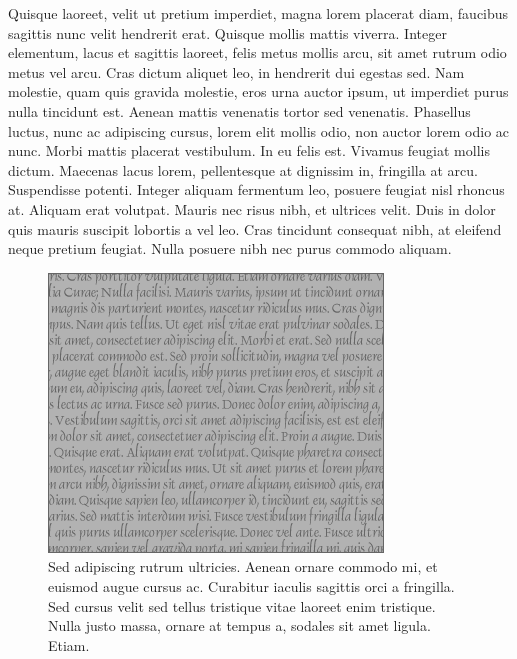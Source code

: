 Quisque laoreet, velit ut pretium imperdiet, magna lorem placerat diam, faucibus sagittis nunc velit hendrerit erat.
Quisque mollis mattis viverra.
Integer elementum, lacus et sagittis laoreet, felis metus mollis arcu, sit amet rutrum odio metus vel arcu.
Cras dictum aliquet leo, in hendrerit dui egestas sed.
Nam molestie, quam quis gravida molestie, eros urna auctor ipsum, ut imperdiet purus nulla tincidunt est.
Aenean mattis venenatis tortor sed venenatis.
Phasellus luctus, nunc ac adipiscing cursus, lorem elit mollis odio, non auctor lorem odio ac nunc.
Morbi mattis placerat vestibulum.
In eu felis est.
Vivamus feugiat mollis dictum.
Maecenas lacus lorem, pellentesque at dignissim in, fringilla at arcu.
Suspendisse potenti.
Integer aliquam fermentum leo, posuere feugiat nisl rhoncus at.
Aliquam erat volutpat.
Mauris nec risus nibh, et ultrices velit.
Duis in dolor quis mauris suscipit lobortis a vel leo.
Cras tincidunt consequat nibh, at eleifend neque pretium feugiat.
Nulla posuere nibh nec purus commodo aliquam.

\begin{figure}[t]
  \centering
  \includegraphics{figs/large-rectangle-gray}
  \caption[Sed adipiscing rutrum]{
    Sed adipiscing rutrum ultricies.
Aenean ornare commodo mi, et euismod augue cursus ac.
Curabitur iaculis sagittis orci a fringilla.
Sed cursus velit sed tellus tristique vitae laoreet enim tristique.
Nulla justo massa, ornare at tempus a, sodales sit amet ligula.
Etiam.
  }
\end{figure}

